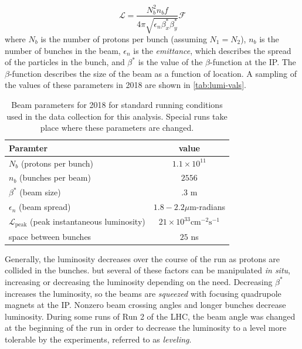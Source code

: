 \begin{equation}
\mathcal{L} = \frac{N_b^2 n_b f }{4\pi \sqrt{\epsilon_n \beta^*_x \beta^*_y}}\mathcal{F}
\end{equation}
where $N_b$ is the number of protons per bunch (assuming $N_1 = N_2$), $n_b$ is the number of bunches in the beam, $\epsilon_n$ is the \emph{emittance}, which describes the spread of the particles in the bunch, and $\beta^*$ is the value of the $\beta$-function at the \ac{IP}. The $\beta$-function describes the size of the beam as a function of location. A sampling of the values of these parameters in 2018 are shown in \autoref{tab:lumi-vals}. \cite{pdg}


\begin{table}
\centering
\begin{tabular}{lc}
\hline
Paramter & value  \\
\hline
$N_b$ (protons per bunch)                                           & $1.1 \times 10^{11}$   \\
$n_b$ (bunches per beam)                                            & $2556$   \\
$\beta^*$ (beam size)                                               & $.3$ m   \\
$\epsilon_n$ (beam spread)                                          & $1.8-2.2 \mu$m-radians   \\
$\mathcal{L}_{\textrm{peak}}$ (peak instantaneous luminosity)       & $21 \times 10^{33} \textrm{cm}^{-2}\textrm{s}^{-1}$   \\
space between bunches                                               & $25$ ns   \\
\hline
\end{tabular}
\caption{Beam parameters for 2018 for standard running conditions used in the data collection for this analysis. Special runs take place where these parameters are changed.}
\label{tab:lumi-vals}
\end{table}

Generally, the luminosity decreases over the course of the run as protons are collided in the bunches. but several of these factors can be manipulated \emph{in situ}, increasing or decreasing the luminosity depending on the need. Decreasing $\beta^*$ increases the luminosity, so the beams are \emph{squeezed} with focusing quadrupole magnets at the \ac{IP}. Nonzero beam crossing angles and longer bunches decrease luminosity. During some runs of Run 2 of the \ac{LHC}, the beam angle was changed at the beginning of the run in order to decrease the luminosity to a level more tolerable by the experiments, referred to as \emph{leveling}.

